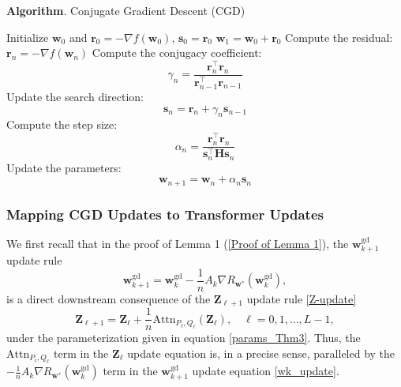 \documentclass[11pt]{article}
\numberwithin{equation}{section}
\begin{document}
\begin{algorithm}
\caption*{\textbf{Algorithm}. Conjugate Gradient Descent (CGD)}
\begin{algorithmic}
    \State Initialize \( \mathbf{w}_0 \) and \( \mathbf{r}_0 = -\nabla f(\mathbf{w}_0) \), \( \mathbf{s}_0 = \mathbf{r}_0 \)
    \State \(\mathbf{w}_1 = \mathbf{w}_0 + \mathbf{r}_0\)
        \State Compute the residual: \( \mathbf{r}_n = -\nabla f(\mathbf{w}_n) \)
        \State Compute the conjugacy coefficient: 
        \[
        \gamma_n = \frac{\mathbf{r}_n^\top \mathbf{r}_n}{\mathbf{r}_{n-1}^\top \mathbf{r}_{n-1}}
        \]
        \State Update the search direction: 
        \[
        \mathbf{s}_n = \mathbf{r}_n + \gamma_n \mathbf{s}_{n-1}
        \]
        \State Compute the step size: 
        \[
        \alpha_n = \frac{\mathbf{r}_n^\top \mathbf{r}_n}{\mathbf{s}_n^\top \mathbf{H} \mathbf{s}_n}
        \]
        \State Update the parameters: 
        \[
        \mathbf{w}_{n+1} = \mathbf{w}_n + \alpha_n \mathbf{s}_n
        \]
    \EndFor
\end{algorithmic}
\end{algorithm}
\FloatBarrier

\subsubsection*{Mapping CGD Updates to Transformer Updates}

We first recall that in the proof of Lemma 1 (\ref{Proof of Lemma 1}), the \(\mathbf{w}_{k+1}^{\text{gd}}\) update rule
\begin{equation}
\mathbf{w}_{k+1}^{\text{gd}} = \mathbf{w}_k^{\text{gd}} - \frac{1}{n} A_k \nabla R_{\mathbf{w}^*}(\mathbf{w}_k^{\text{gd}}), \label{wk_update}
\end{equation}
is a direct downstream consequence of the \(\mathbf{Z}_{\ell+1}\) update rule \eqref{Z-update}
\begin{equation}
\mathbf{Z}_{\ell+1} = \mathbf{Z}_\ell + \frac{1}{n} \mathrm{Attn}_{P_\ell, Q_\ell} (\mathbf{Z}_\ell), \quad \ell = 0, 1, \dots, L-1,
\end{equation}
under the parameterization given in equation \eqref{params_Thm3}. Thus, the \(\mathrm{Attn}_{P_\ell, Q_\ell}\) term in the \(\mathbf Z_\ell\) update equation is, in a precise sense, paralleled by the \(-\frac{1}{n} A_k \nabla R_{\mathbf{w}^*}(\mathbf{w}_k^{\text{gd}})\) term in the \(\mathbf{w}_{k+1}^{\text{gd}}\) update equation \eqref{wk_update}.
\end{document}
